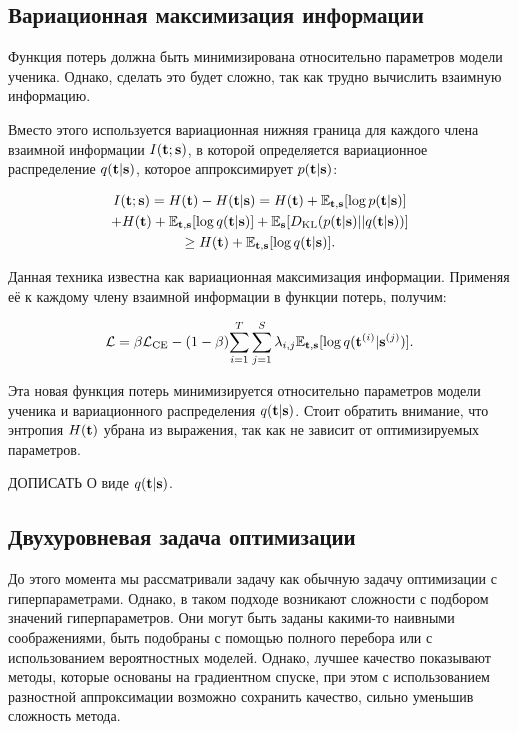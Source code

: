 \subsection{Вариационная максимизация информации}

Функция потерь должна быть минимизирована относительно параметров модели ученика. Однако, сделать это будет сложно, так как трудно вычислить взаимную информацию.

Вместо этого используется вариационная нижняя граница для каждого члена взаимной информации $I(\bold{t}; \bold{s})$,
в которой определяется вариационное распределение $q(\bold{t}|\bold{s})$, которое аппроксимирует $p(\bold{t}|\bold{s})$:

\begin{multline}
    I(\bold{t}; \bold{s}) = H(\bold{t}) - H(\bold{t} | \bold{s}) =  H(\bold{t}) + \mathbb{E}_{\bold{t},\bold{s}}[\log{p(\bold{t}|\bold{s})}] \\
    + H(\bold{t}) + \mathbb{E}_{\bold{t},\bold{s}}[\log{q(\bold{t}|\bold{s})}] + \mathbb{E}_{\bold{s}}[D_{\text{KL}}(p(\bold{t}|\bold{s})||q(\bold{t}|\bold{s}))] \\
    \geq H(\bold{t}) + \mathbb{E}_{\bold{t},\bold{s}}[\log{q(\bold{t}|\bold{s})}].
\end{multline}

Данная техника известна как вариационная максимизация информации. Применяя её к каждому члену взаимной информации в функции потерь, получим:

$$ \mathcal{L} = \beta \mathcal{L}_\text{CE} - (1 - \beta){\sum_{i=1}^T \sum_{j=1}^S \lambda_{i, j} \mathbb{E}_{\bold{t},\bold{s}}[\log{q(\bold{t}^{(i)}|\bold{s}^{(j)})}] }.$$

Эта новая функция потерь минимизируется относительно параметров модели ученика и вариационного распределения $q(\bold{t}|\bold{s})$.
Стоит обратить внимание, что энтропия $H(\bold{t})$ убрана из выражения, так как не зависит от оптимизируемых параметров.

ДОПИСАТЬ О виде $q(\bold{t}|\bold{s})$.

\subsection{Двухуровневая задача оптимизации}

До этого момента мы рассматривали задачу как обычную задачу оптимизации с гиперпараметрами.
Однако, в таком подходе возникают сложности с подбором значений гиперпараметров.
Они могут быть заданы какими-то наивными соображениями, быть подобраны с помощью полного перебора или с использованием вероятностных моделей.
Однако, лучшее качество показывают методы, которые основаны на градиентном спуске, при этом с использованием разностной аппроксимации возможно сохранить
качество, сильно уменьшив сложность метода.

